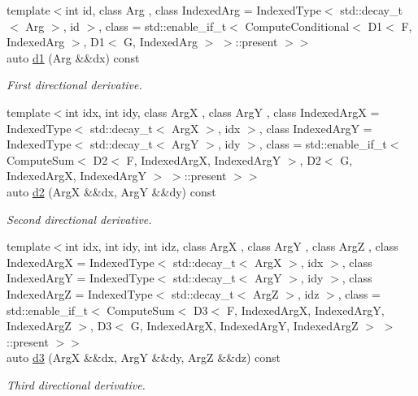 \begin{DoxyCompactItemize}
{\footnotesize template$<$int id, class Arg , class Indexed\+Arg  = Indexed\+Type$<$ std\+::decay\+\_\+t$<$ Arg $>$, id $>$, class  = std\+::enable\+\_\+if\+\_\+t$<$                       Compute\+Conditional$<$ D1$<$ F, Indexed\+Arg $>$, D1$<$ G, Indexed\+Arg $>$ $>$\+::present $>$$>$ }\\auto \hyperlink{structFunG_1_1Min_a0819114c8ea56ce33e41a24c9ebba3dd}{d1} (Arg \&\&dx) const 
\begin{DoxyCompactList}\small\item\em First directional derivative. \end{DoxyCompactList}\item 
{\footnotesize template$<$int idx, int idy, class ArgX , class ArgY , class Indexed\+ArgX  = Indexed\+Type$<$ std\+::decay\+\_\+t$<$ Arg\+X $>$, idx $>$, class Indexed\+ArgY  = Indexed\+Type$<$ std\+::decay\+\_\+t$<$ Arg\+Y $>$, idy $>$, class  = std\+::enable\+\_\+if\+\_\+t$<$ Compute\+Sum$<$ D2$<$ F, Indexed\+Arg\+X, Indexed\+Arg\+Y $>$,                                                  D2$<$ G, Indexed\+Arg\+X, Indexed\+Arg\+Y $>$ $>$\+::present $>$$>$ }\\auto \hyperlink{structFunG_1_1Min_a4ba4840e81aa0a3741dee6aa2dcfee1b}{d2} (ArgX \&\&dx, ArgY \&\&dy) const 
\begin{DoxyCompactList}\small\item\em Second directional derivative. \end{DoxyCompactList}\item 
{\footnotesize template$<$int idx, int idy, int idz, class ArgX , class ArgY , class ArgZ , class Indexed\+ArgX  = Indexed\+Type$<$ std\+::decay\+\_\+t$<$ Arg\+X $>$, idx $>$, class Indexed\+ArgY  = Indexed\+Type$<$ std\+::decay\+\_\+t$<$ Arg\+Y $>$, idy $>$, class Indexed\+ArgZ  = Indexed\+Type$<$ std\+::decay\+\_\+t$<$ Arg\+Z $>$, idz $>$, class  = std\+::enable\+\_\+if\+\_\+t$<$                       Compute\+Sum$<$ D3$<$ F, Indexed\+Arg\+X, Indexed\+Arg\+Y, Indexed\+Arg\+Z $>$,                                   D3$<$ G, Indexed\+Arg\+X, Indexed\+Arg\+Y, Indexed\+Arg\+Z $>$ $>$\+::present $>$$>$ }\\auto \hyperlink{structFunG_1_1Min_aea623fee862f72635b83f3fdc45a09d5}{d3} (ArgX \&\&dx, ArgY \&\&dy, ArgZ \&\&dz) const 
\begin{DoxyCompactList}\small\item\em Third directional derivative. \end{DoxyCompactList}\end{DoxyCompactItemize}



